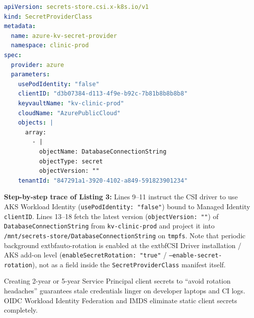 \begin{lstlisting}[language=yaml, caption={SecretProviderClass for \texttt{tmpfs} Key Vault Secret Mounting}]
apiVersion: secrets-store.csi.x-k8s.io/v1
kind: SecretProviderClass
metadata:
  name: azure-kv-secret-provider
  namespace: clinic-prod
spec:
  provider: azure
  parameters:
    usePodIdentity: "false"
    clientID: "d3b07384-d113-4f9e-b92c-7b81b8b8b8b8"
    keyvaultName: "kv-clinic-prod"
    cloudName: "AzurePublicCloud"
    objects: |
      array:
        - |
          objectName: DatabaseConnectionString
          objectType: secret
          objectVersion: ""
    tenantId: "847291a1-3920-4102-a849-591823901234"
\end{lstlisting}

\textbf{Step-by-step trace of Listing 3:} Lines 9--11 instruct the CSI driver to use AKS Workload Identity (\texttt{usePodIdentity: "false"}) bound to Managed Identity \texttt{clientID}. Lines 13--18 fetch the latest version (\texttt{objectVersion: ""}) of \texttt{DatabaseConnectionString} from \texttt{kv-clinic-prod} and project it into \texttt{/mnt/secrets-store/DatabaseConnectionString} on \texttt{tmpfs}. Note that periodic background 	extbf{auto-rotation} is enabled at the 	extbf{CSI Driver installation / AKS add-on level} (\texttt{enableSecretRotation: "true"} / \texttt{--enable-secret-rotation}), not as a field inside the \texttt{SecretProviderClass} manifest itself.

\begin{commonmistakebox}
Creating 2-year or 5-year Service Principal client secrets to ``avoid rotation headaches'' guarantees stale credentials linger on developer laptops and CI logs. OIDC Workload Identity Federation and IMDS eliminate static client secrets completely.
\end{commonmistakebox}

